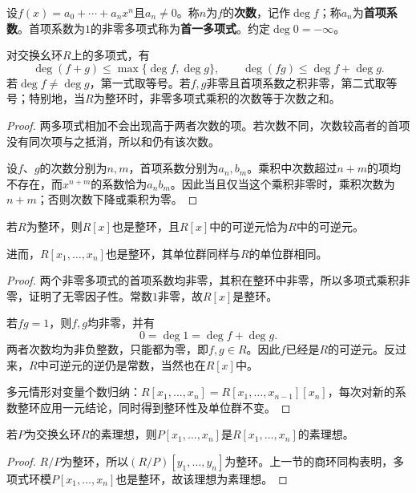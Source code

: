 \begin{definition}\label{p2:concept:c3-degree}
设$f(x)=a_0+\cdots+a_nx^n$且$a_n\ne0$。称$n$为$f$的\textbf{次数}，记作$\deg f$；称$a_n$为\textbf{首项系数}。首项系数为$1$的非零多项式称为\textbf{首一多项式}。约定$\deg0=-\infty$。
\end{definition}

\begin{proposition}
对交换幺环$R$上的多项式，有
\[
\deg(f+g)\le\max\{\deg f,\deg g\},\qquad
\deg(fg)\le\deg f+\deg g.
\]
若$\deg f\ne\deg g$，第一式取等号。若$f,g$非零且首项系数之积非零，第二式取等号；特别地，当$R$为整环时，非零多项式乘积的次数等于次数之和。
\end{proposition}
\begin{proof}
两多项式相加不会出现高于两者次数的项。若次数不同，次数较高者的首项没有同次项与之抵消，所以和仍有该次数。

设$f$、$g$的次数分别为$n,m$，首项系数分别为$a_n,b_m$。乘积中次数超过$n+m$的项均不存在，而$x^{n+m}$的系数恰为$a_nb_m$。因此当且仅当这个乘积非零时，乘积次数为$n+m$；否则次数下降或乘积为零。
\end{proof}

\begin{proposition}
若$R$为整环，则$R[x]$也是整环，且$R[x]$中的可逆元恰为$R$中的可逆元。

进而，$R[x_1,\ldots,x_n]$也是整环，其单位群同样与$R$的单位群相同。
\end{proposition}
\begin{proof}
两个非零多项式的首项系数均非零，其积在整环中非零，所以多项式乘积非零，证明了无零因子性。常数$1$非零，故$R[x]$是整环。

若$fg=1$，则$f,g$均非零，并有
\[
0=\deg1=\deg f+\deg g.
\]
两者次数均为非负整数，只能都为零，即$f,g\in R$。因此$f$已经是$R$的可逆元。反过来，$R$中可逆元的逆仍是常数，当然也在$R[x]$中。

多元情形对变量个数归纳：$R[x_1,\ldots,x_n]=R[x_1,\ldots,x_{n-1}][x_n]$，每次对新的系数整环应用一元结论，同时得到整环性及单位群不变。
\end{proof}

\begin{corollary}
若$P$为交换幺环$R$的素理想，则$P[x_1,\ldots,x_n]$是$R[x_1,\ldots,x_n]$的素理想。
\end{corollary}
\begin{proof}
$R/P$为整环，所以$(R/P)[y_1,\ldots,y_n]$为整环。上一节的商环同构表明，多项式环模$P[x_1,\ldots,x_n]$也是整环，故该理想为素理想。
\end{proof}

